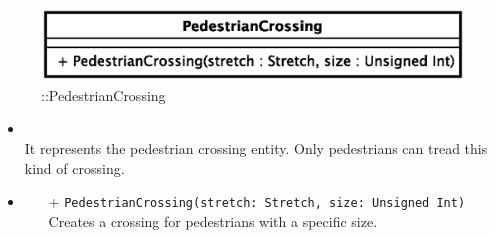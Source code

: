 \begin{figure}[h]
\centering
\includegraphics[scale=0.6,keepaspectratio]{images/solution/pedestrian_crossing.eps}
\caption{\pReactiveComponentStretchDecoration::PedestrianCrossing}
\label{fig:sd-app-pedestrian_crossing}
\end{figure}
\FloatBarrier
\begin{itemize}
  \item \textbf{\descr} \\
    It represents the pedestrian crossing entity. Only pedestrians can tread this kind 
of crossing.
\item \textbf{\ops}
  \begin{itemize}
    \item[+] \texttt{PedestrianCrossing(stretch: Stretch, size: Unsigned Int)} \\
Creates a crossing for pedestrians with a specific size.
  	\end{itemize}
\end{itemize}
